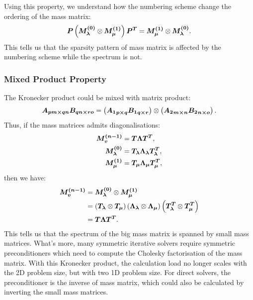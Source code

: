 Using this property, we understand how the numbering scheme change the ordering of the mass matrix:
\begin{equation}
	\boldsymbol{P}\left( \boldsymbol{M^{(0)}_{\lambda}} \otimes \boldsymbol{M^{(1)}_{\mu}}\right) \boldsymbol{P^T} = \boldsymbol{M^{(1)}_{\mu}} \otimes \boldsymbol{M^{(0)}_{\lambda}}.
\end{equation}
This tells us that the sparsity pattern of mass matrix is affected by the numbering scheme while the spectrum is not.\\

\subsubsection{Mixed Product Property}
The Kronecker product could be mixed with matrix product:
\begin{equation}
	\boldsymbol{A_{pm\times qn}} \boldsymbol{B_{qn\times ro}} = \left(\boldsymbol{{A_1}_{p\times q}} \boldsymbol{{B_1}_{q\times r}} \right) \otimes \left( \boldsymbol{{A_2}_{m\times n}}\boldsymbol{{B_2}_{n\times o}} \right).
\end{equation}
Thus, if the mass matrices admits diagonalisations: 
\begin{subequations}
\begin{align}
	\boldsymbol{M_v^{(n-1)}} &= \boldsymbol{T \Lambda T^T}, \\
	\boldsymbol{M_{\lambda}^{(0)}} &= \boldsymbol{T_\lambda \Lambda_\lambda T_\lambda^T},\\
	\boldsymbol{M_{\mu}^{(1)}} &= \boldsymbol{T_\mu \Lambda_\mu T_\mu^T},
\end{align}
\end{subequations}
then we have:
\begin{equation}
\begin{split}
	\boldsymbol{M_v^{(n-1)}} &= \boldsymbol{M_{\lambda}^{(0)}} \otimes \boldsymbol{M_{\mu}^{(1)}}\\
	&= \left(\boldsymbol{T_\lambda} \otimes	\boldsymbol{T_\mu} \right)\left(\boldsymbol{\Lambda_\lambda} \otimes \boldsymbol{\Lambda_\mu} \right) \left(\boldsymbol{T_\lambda^T} \otimes \boldsymbol{T_\mu^T} \right) \\
	&= \boldsymbol{T \Lambda T^T}.
\end{split}
\end{equation}
This tells us that the spectrum of the big mass matrix is spanned by small mass matrices. What's more, many symmetric iterative solvers require symmetric preconditioners which need to compute the Cholesky factorisation of the mass matrix. With this Kronecker product, the calculation load no longer scales with the 2D problem size, but with two 1D problem size. For direct solvers, the preconditioner is the inverse of mass matrix, which could also be calculated by inverting the small mass matrices. \\

